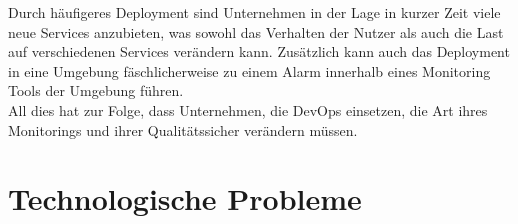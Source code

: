 Durch häufigeres Deployment sind Unternehmen in der Lage in kurzer Zeit viele neue Services anzubieten, was sowohl das Verhalten der Nutzer als auch die Last auf verschiedenen Services verändern kann. Zusätzlich kann auch das Deployment in eine Umgebung fäschlicherweise zu einem Alarm innerhalb eines Monitoring Tools der Umgebung führen. \\
All dies hat zur Folge, dass Unternehmen, die DevOps einsetzen, die Art ihres Monitorings und ihrer Qualitätssicher verändern müssen.

\section{Technologische Probleme}
